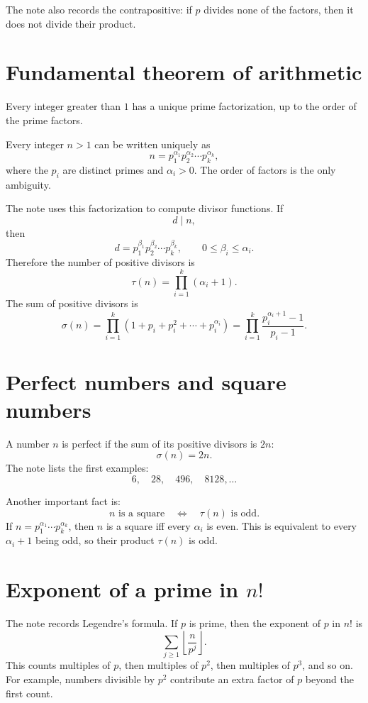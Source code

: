 The note also records the contrapositive: if $p$ divides none of the factors, then it does not divide their product.

\section{Fundamental theorem of arithmetic}

\begin{theorem}
Every integer greater than \(1\) has a unique prime factorization, up to the order of the prime factors.
\end{theorem}


Every integer $n>1$ can be written uniquely as
\[
  n=p_1^{\alpha_1}p_2^{\alpha_2}\cdots p_k^{\alpha_k},
\]
where the $p_i$ are distinct primes and $\alpha_i>0$.  The order of factors is the only ambiguity.

The note uses this factorization to compute divisor functions.  If
\[
  d\mid n,
\]
then
\[
  d=p_1^{\beta_1}p_2^{\beta_2}\cdots p_k^{\beta_k},
  \qquad 0\le\beta_i\le\alpha_i.
\]
Therefore the number of positive divisors is
\[
  \tau(n)=\prod_{i=1}^k(\alpha_i+1).
\]
The sum of positive divisors is
\[
  \sigma(n)=\prod_{i=1}^k
  (1+p_i+p_i^2+\cdots+p_i^{\alpha_i})
  =\prod_{i=1}^k \frac{p_i^{\alpha_i+1}-1}{p_i-1}.
\]

\section{Perfect numbers and square numbers}

A number $n$ is perfect if the sum of its positive divisors is $2n$:
\[
  \sigma(n)=2n.
\]
The note lists the first examples:
\[
  6,\quad 28,\quad 496,\quad 8128,\ldots
\]

Another important fact is:
\[
  n\text{ is a square}\quad\Longleftrightarrow\quad \tau(n)\text{ is odd}.
\]
If $n=p_1^{\alpha_1}\cdots p_k^{\alpha_k}$, then $n$ is a square iff every $\alpha_i$ is even.  This is equivalent to every $\alpha_i+1$ being odd, so their product $\tau(n)$ is odd.

\section[Exponent of a prime in n factorial]{Exponent of a prime in $n!$}

The note records Legendre's formula.  If $p$ is prime, then the exponent of $p$ in $n!$ is
\[
  \sum_{j\ge1} \left\lfloor \frac n{p^j}\right\rfloor.
\]
This counts multiples of $p$, then multiples of $p^2$, then multiples of $p^3$, and so on.  For example, numbers divisible by $p^2$ contribute an extra factor of $p$ beyond the first count.

